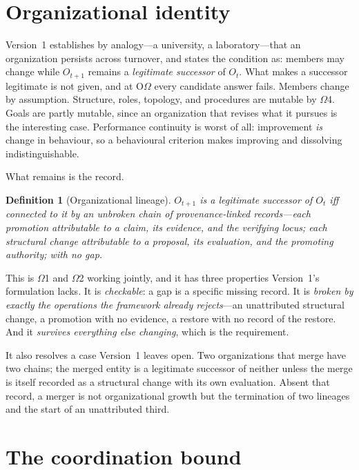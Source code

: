 \documentclass[11pt]{article}
\newtheorem{definition}{Definition}
\newcommand{\OOm}{\ensuremath{\mathrm{O}\Omega}}
\begin{document}
\section{Organizational identity}

Version~1 establishes by analogy---a university, a laboratory---that an organization persists across turnover, and states the condition as: members may change while $O_{t+1}$ remains a \emph{legitimate successor} of $O_t$. What makes a successor legitimate is not given, and at \OOm{} every candidate answer fails. Members change by assumption. Structure, roles, topology, and procedures are mutable by $\Omega$4. Goals are partly mutable, since an organization that revises what it pursues is the interesting case. Performance continuity is worst of all: improvement \emph{is} change in behaviour, so a behavioural criterion makes improving and dissolving indistinguishable.

What remains is the record.

\begin{definition}[Organizational lineage]
$O_{t+1}$ is a legitimate successor of $O_t$ iff connected to it by an unbroken chain of provenance-linked records---each promotion attributable to a claim, its evidence, and the verifying locus; each structural change attributable to a proposal, its evaluation, and the promoting authority; with no gap.
\end{definition}

This is $\Omega$1 and $\Omega$2 working jointly, and it has three properties Version~1's formulation lacks. It is \emph{checkable}: a gap is a specific missing record. It is \emph{broken by exactly the operations the framework already rejects}---an unattributed structural change, a promotion with no evidence, a restore with no record of the restore. And it \emph{survives everything else changing}, which is the requirement.

It also resolves a case Version~1 leaves open. Two organizations that merge have two chains; the merged entity is a legitimate successor of neither unless the merge is itself recorded as a structural change with its own evaluation. Absent that record, a merger is not organizational growth but the termination of two lineages and the start of an unattributed third.

\section{The coordination bound}\label{sec:bound}
\end{document}
